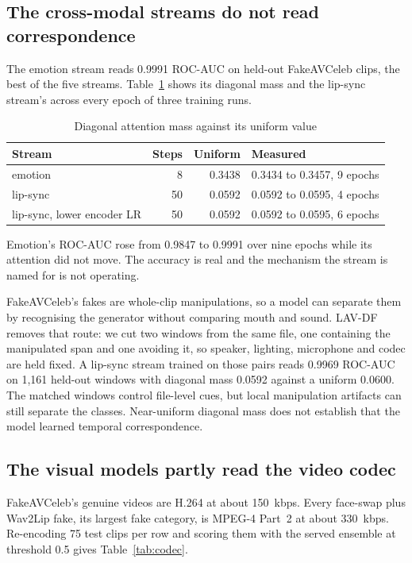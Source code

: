 \documentclass[conference]{IEEEtran}
\begin{document}
\subsection{The cross-modal streams do not read correspondence}

The emotion stream reads 0.9991 ROC-AUC on held-out FakeAVCeleb clips, the best
of the five streams. Table~\ref{tab:diag} shows its diagonal mass and the
lip-sync stream's across every epoch of three training runs.

\begin{table}[htbp]
\caption{Diagonal attention mass against its uniform value}
\label{tab:diag}
\centering
\begin{tabular}{lrrl}
\toprule
Stream & Steps & Uniform & Measured \\
\midrule
emotion & 8 & 0.3438 & 0.3434 to 0.3457, 9 epochs \\
lip-sync & 50 & 0.0592 & 0.0592 to 0.0595, 4 epochs \\
lip-sync, lower encoder LR & 50 & 0.0592 & 0.0592 to 0.0595, 6 epochs \\
\bottomrule
\end{tabular}
\end{table}

Emotion's ROC-AUC rose from 0.9847 to 0.9991 over nine epochs while its
attention did not move. The accuracy is real and the mechanism the stream is
named for is not operating.

FakeAVCeleb's fakes are whole-clip manipulations, so a model can separate them
by recognising the generator without comparing mouth and sound. LAV-DF removes
that route: we cut two windows from the same file, one containing the
manipulated span and one avoiding it, so speaker, lighting, microphone and
codec are held fixed. A lip-sync stream trained on those pairs reads 0.9969
ROC-AUC on 1,161 held-out windows with diagonal mass 0.0592 against a uniform
0.0600. The matched windows control file-level cues, but local manipulation
artifacts can still separate the classes. Near-uniform diagonal mass does not
establish that the model learned temporal correspondence.

\subsection{The visual models partly read the video codec}

FakeAVCeleb's genuine videos are H.264 at about 150~kbps. Every face-swap plus
Wav2Lip fake, its largest fake category, is MPEG-4 Part~2 at about 330~kbps.
Re-encoding 75 test clips per row and scoring them with the served ensemble at
threshold 0.5 gives Table~\ref{tab:codec}.
\end{document}
